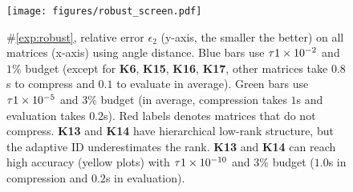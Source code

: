 %



\begin{figure}[!t]
  \centering
  \texttt{[image: figures/robust\_screen.pdf]}
  \caption{
    \#\ref{exp:robust}, relative error $\epsilon_2$ 
    (y-axis, the smaller the better) 
    on all matrices (x-axis) using angle distance. 
    Blue bars use $\tau\num{1E-2}$ and $1\%$ budget
    (except for \textbf{K6}, \textbf{K15}, \textbf{K16}, \textbf{K17}, other matrices take $0.8$s
    to compress and $0.1$ to evaluate in average).
    Green bars use $\tau\num{1E-5}$ and $3\%$ budget
    (in average, compression takes $1$s and
    evaluation takes $0.2$s).
    Red labels denotes matrices that do not compress.
    \textbf{K13} and \textbf{K14} have hierarchical low-rank structure, but the adaptive ID underestimates the rank.
    \textbf{K13} and \textbf{K14} can reach high accuracy (yellow plots) 
    with $\tau\num{1E-10}$ and $3\%$ budget ($1.0$s in compression
    and $0.2$s in evaluation).
  }
  \label{fig:robust}
\end{figure}



